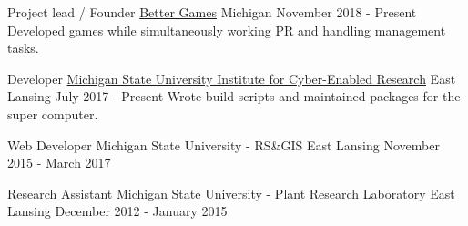 
\begin{cventries}
  \cventry
    {Project lead / Founder} %
    {\href{https://www.better-games.org}{Better Games}} %
    {Michigan} %
    {November 2018 - Present} %
    {
        {Developed games while simultaneously working PR and handling management tasks.}
    }

  \cventry
    {Developer}
    {\href{https://icer.msu.edu/}{Michigan State University Institute for Cyber-Enabled Research}}
    {East Lansing}
    {July 2017 - Present}
    {
        {Wrote build scripts and maintained packages for the super computer.}
    }

  \cventry
    {Web Developer}
    {Michigan State University - RS&GIS}
    {East Lansing}
    {November 2015 - March 2017}
    {
        {} %
    }

  \cventry
    {Research Assistant}
    {Michigan State University - Plant Research Laboratory}
    {East Lansing}
    {December 2012 - January 2015}
    {
        {} %
    }
\end{cventries}
